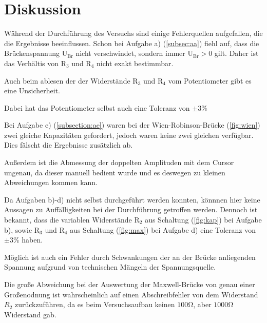 \newpage
\section{Diskussion}
\label{sec:Diskussion}
Während der Durchführung des Versuchs sind einige Fehlerquellen aufgefallen, die die Ergebnisse beeinflussen.
Schon bei Aufgabe a) (\ref{subsec:aa}) fiehl auf, dass die Brückenspannung $\text{U}_\text{Br}$ nicht verschwindet,
sondern immer $\text{U}_\text{Br} > 0$ gilt. 
Daher ist das Verhältis von $\text{R}_3$ und $\text{R}_4$ nicht exakt bestimmbar.

\noindent
Auch beim ablesen der der Widerstände $\text{R}_3$ und $\text{R}_4$ vom Potentiometer gibt es eine Unsicherheit.

\noindent
Dabei hat das Potentiometer selbst auch eine Toleranz von $\pm 3\%$

\noindent
Bei Aufgabe e) (\ref{subsection:ae}) waren bei der Wien-Robinson-Brücke (\ref{fig:wien}) zwei gleiche Kapazitäten gefordert,
jedoch waren keine zwei gleichen verfügbar. 
Dies fälscht die Ergebnisse zusätzlich ab.

\noindent
Außerdem ist die Abmessung der doppelten Amplituden mit dem Cursor ungenau, da dieser manuell bedient wurde und es deswegen zu kleinen Abweichungen kommen kann.

\noindent
Da Aufgaben b)-d) nicht selbst durchgeführt werden konnten, könnnen hier keine Aussagen zu Auffälligkeiten bei der Durchführung getroffen werden.
Dennoch ist bekannt, dass die variablen Widerstände $\text{R}_2$ aus Schaltung (\ref{fig:kap}) bei Aufgabe b), sowie $\text{R}_3$ und $\text{R}_4$ aus Schaltung (\ref{fig:max}) bei Aufgabe d) eine Toleranz von $\pm 3\%$ haben.

\noindent 
Möglich ist auch ein Fehler durch Schwankungen der an der Brücke anliegenden Spannung aufgrund von technischen Mängeln der Spannungsquelle.


\noindent 
Die große Abweichung bei der Auswertung der Maxwell-Brücke von genau einer Großenodnung ist wahrscheinlich auf einen Abschreibfehler von dem Widerstand $R_2$ zurückzuführen, da es beim Versuchsaufbau
keinen $100 \si{\ohm}$, aber $1000 \si{\ohm}$ Widerstand gab.